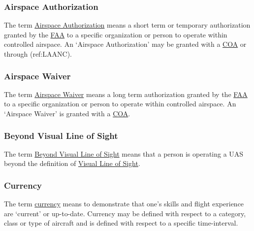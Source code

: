\documentclass[
]{book}
\begin{document}
\hypertarget{AA}{%
\subsubsection*{Airspace Authorization}\label{AA}}

The term \protect\hyperlink{AA}{Airspace Authorization} means a short term or temporary authorization granted by the \protect\hyperlink{FAA}{FAA} to a specific organization or person to operate within controlled airspace. An `Airspace Authorization' may be granted with a \protect\hyperlink{COA}{COA} or through (ref:LAANC).





\hypertarget{AW}{%
\subsubsection*{Airspace Waiver}\label{AW}}

The term \protect\hyperlink{AW}{Airspace Waiver} means a long term authorization granted by the \protect\hyperlink{FAA}{FAA} to a specific organization or person to operate within controlled airspace. An `Airspace Waiver' is granted with a \protect\hyperlink{COA}{COA}.





\hypertarget{BVLOS}{%
\subsubsection*{Beyond Visual Line of Sight}\label{BVLOS}}

The term \protect\hyperlink{BVLOS}{Beyond Visual Line of Sight} means that a person is operating a UAS beyond the definition of \protect\hyperlink{VLOS}{Visual Line of Sight}.





\hypertarget{currency}{%
\subsubsection*{Currency}\label{currency}}

The term \protect\hyperlink{currency}{currency} means to demonstrate that one's skills and flight experience are `current' or up-to-date. Currency may be defined with respect to a category, class or type of aircraft and is defined with respect to a specific time-interval.
\end{document}
